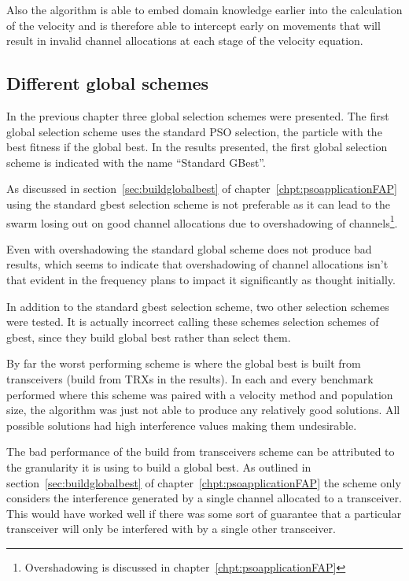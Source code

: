 Also the algorithm is able to embed domain knowledge earlier into the calculation of the velocity and is therefore able to intercept early on movements that will result in invalid channel allocations at each stage of the velocity equation.

\subsection{Different global schemes}
\label{sec:diffglobalschemes}
In the previous chapter three global selection schemes were presented. The first global selection scheme uses the standard PSO selection, the particle with the best fitness if the global best. In the results presented, the first global selection scheme is indicated with the name ``Standard GBest''.

As discussed in section~\ref{sec:buildglobalbest} of chapter~\ref{chpt:psoapplicationFAP} using the standard gbest selection scheme is not preferable as it can lead to the swarm losing out on good channel allocations due to overshadowing of channels\footnote{Overshadowing is discussed in chapter~\ref{chpt:psoapplicationFAP}}.

Even with overshadowing the standard global scheme does not produce bad results, which seems to indicate that overshadowing of channel allocations isn't that evident in the frequency plans to impact it significantly as thought initially.

In addition to the standard gbest selection scheme, two other selection schemes were tested. It is actually incorrect calling these schemes selection schemes of gbest, since they build global best rather than select them.

By far the worst performing scheme is where the global best is built from transceivers (build from TRXs in the results). In each and every benchmark performed where this scheme was paired with a velocity method and population size, the algorithm was just not able to produce any relatively good solutions. All possible solutions had high interference values making them undesirable.

The bad performance of the build from transceivers scheme can be attributed to the granularity it is using to build a global best. As outlined in section~\ref{sec:buildglobalbest} of chapter~\ref{chpt:psoapplicationFAP} the scheme only considers the interference generated by a single channel allocated to a transceiver. This would have worked well if there was some sort of guarantee that a particular transceiver will only be interfered with by a single other transceiver.

